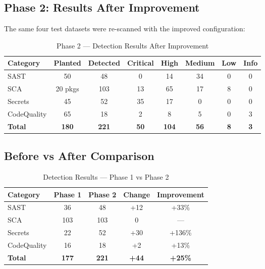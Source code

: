 \documentclass[12pt,a4paper]{report}
\begin{document}
\subsection{Phase 2: Results After Improvement}

The same four test datasets were re-scanned with the improved configuration:

\begin{table}[H]
\centering
\caption{Phase 2 --- Detection Results After Improvement}
\label{tab:phase2_results}
\begin{tabular}{|l|c|c|c|c|c|c|c|}
\hline
\textbf{Category} & \textbf{Planted} & \textbf{Detected} & \textbf{Critical} & \textbf{High} & \textbf{Medium} & \textbf{Low} & \textbf{Info} \\
\hline
SAST & 50 & 48 & 0 & 14 & 34 & 0 & 0 \\
\hline
SCA & 20 pkgs & 103 & 13 & 65 & 17 & 8 & 0 \\
\hline
Secrets & 45 & 52 & 35 & 17 & 0 & 0 & 0 \\
\hline
CodeQuality & 65 & 18 & 2 & 8 & 5 & 0 & 3 \\
\hline
\textbf{Total} & \textbf{180} & \textbf{221} & \textbf{50} & \textbf{104} & \textbf{56} & \textbf{8} & \textbf{3} \\
\hline
\end{tabular}
\end{table}

\subsection{Before vs After Comparison}

\begin{table}[H]
\centering
\caption{Detection Results --- Phase 1 vs Phase 2}
\label{tab:before_after}
\begin{tabular}{|l|c|c|c|c|}
\hline
\textbf{Category} & \textbf{Phase 1} & \textbf{Phase 2} & \textbf{Change} & \textbf{Improvement} \\
\hline
SAST & 36 & 48 & +12 & +33\% \\
\hline
SCA & 103 & 103 & 0 & --- \\
\hline
Secrets & 22 & 52 & +30 & +136\% \\
\hline
CodeQuality & 16 & 18 & +2 & +13\% \\
\hline
\textbf{Total} & \textbf{177} & \textbf{221} & \textbf{+44} & \textbf{+25\%} \\
\hline
\end{tabular}
\end{table}
\end{document}
